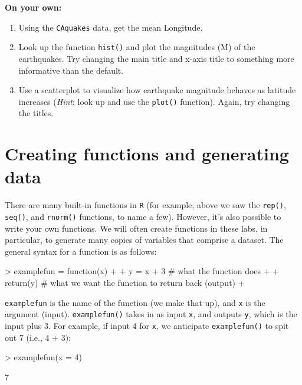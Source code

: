 \documentclass{exam}
\begin{document}
\noindent\textbf{On your own:}

\begin{enumerate}

\item Using the \texttt{CAquakes} data, get the mean Longitude.
\item Look up the function \texttt{hist()} and plot the magnitudes (M) of the earthquakes. Try changing the main title and x-axis title to something more informative than the default.
\item Use a scatterplot to visualize how earthquake magnitude behaves as latitude increases (\textit{Hint}: look up and use the \texttt{plot()} function). Again, try changing the titles.
\end{enumerate}

\begin{solution}
\end{solution}



\section{Creating functions and generating data}

There are many built-in functions in \texttt{R} (for example, above we saw the \texttt{rep()}, \texttt{seq()}, and \texttt{rnorm()} functions, to name a few). However, it's also possible to write your own functions. We will often create functions in these labs, in particular, to generate many copies of variables that comprise a dataset. The general syntax for a function is as follows:
\begin{Schunk}
\begin{Sinput}
> examplefun = function(x) { 
+   
+   y = x + 3 # what the function does
+   
+   return(y) # what we want the function to return back (output)
+ }
\end{Sinput}
\end{Schunk}

\texttt{examplefun} is the name of the function (we make that up), and \texttt{x} is the argument (input). \texttt{examplefun()} takes in as input \texttt{x}, and outputs \texttt{y}, which is the input plus 3. For example, if input 4 for \texttt{x}, we anticipate \texttt{examplefun()} to spit out 7 (i.e., 4 + 3):

\begin{Schunk}
\begin{Sinput}
> examplefun(x = 4)
\end{Sinput}
\begin{Soutput}
[1] 7
\end{Soutput}
\end{Schunk}
\end{document}
